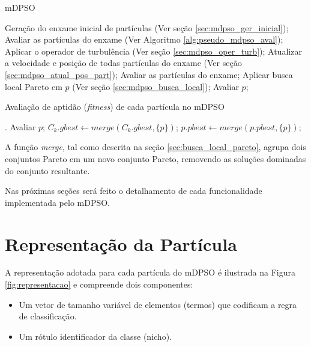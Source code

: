 \documentclass[
	12pt,				%
	openany,			%
	oneside,	
	a4paper,			%
	brazil,				%
	]{unimontes-ppgmsc-abntex2}
\begin{document}
\begin{algorithm}[ht]
\caption{mDPSO}
\label{alg:pseudo_mdpso}
\begin{algorithmic}[1]
\State Geração do enxame inicial de partículas (Ver seção \ref{sec:mdpso_ger_inicial}); 
\State Avaliar as partículas do enxame (Ver Algoritmo \ref{alg:pseudo_mdpso_aval});
  \State Aplicar o operador de turbulência (Ver seção \ref{sec:mdpso_oper_turb}); 
  \State Atualizar a velocidade e posição de todas partículas do enxame (Ver seção \ref{sec:mdpso_atual_pos_part});
  \State Avaliar as partículas do enxame;    
	\State Aplicar busca local Pareto em $p$ (Ver seção \ref{sec:mdpso_busca_local});
	\State Avaliar $p$;
   \EndFor
\EndWhile
\end{algorithmic}
\end{algorithm}

\begin{algorithm}[ht]
\caption{Avaliação de aptidão ({\em fitness}) de cada partícula no mDPSO}
\label{alg:pseudo_mdpso_aval}
\begin{algorithmic}[1]
.
      \State Avaliar $p$;
      \State $C_k.gbest \leftarrow merge(C_k.gbest, \{p\})$;
      \State $p.pbest \leftarrow merge(p.pbest, \{p\})$;
  \EndFor
\end{algorithmic}
\end{algorithm}

A função {\em merge}, tal como descrita na seção \ref{sec:busca_local_pareto}, agrupa dois conjuntos Pareto em um novo conjunto Pareto, removendo as soluções dominadas do conjunto resultante.

Nas próximas seções será feito o detalhamento de cada funcionalidade implementada pelo mDPSO.


\section{Representação da Partícula}
\label{sec:mdpso_repr_part}

A representação adotada para cada partícula do mDPSO é ilustrada na Figura \ref{fig:representacao} e compreende dois componentes:

\begin{itemize}
\item Um vetor de tamanho variável de elementos (termos) que codificam a regra de classificação.
\item Um rótulo identificador da classe (nicho).
\end{itemize}
\end{document}
